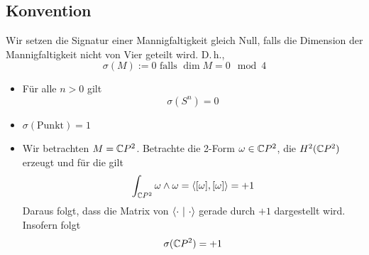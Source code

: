 
\subsection{Konvention}
Wir setzen die Signatur einer Mannigfaltigkeit gleich Null, falls die Dimension der Mannigfaltigkeit nicht von Vier geteilt wird. D.\,h.,
\[ \sigma(M) := 0\text{  falls  } \dim M = 0 \mod{4} \]

\Bsp{}
\begin{itemize}
	\item Für alle $n> 0$ gilt
	\[ \sigma(S^n) = 0 \]
	\item $\sigma(\text{Punkt}) = 1$
	\item Wir betrachten $M = \mathbb{C} P^2$. Betrachte die 2-Form $\omega \in \mathbb{C} P^2$, die $H^2(\mathbb{C} P^2)$ erzeugt und für die gilt
	\[ \int_{\mathbb{C} P^2} \omega \wedge \omega = \left<[\omega], [\omega]\right> = +1 \]
	Daraus folgt, dass die Matrix von $\left<\cdot ~|~\cdot\right>$ gerade durch $+1$ dargestellt wird. Insofern folgt
	\[ \sigma(\mathbb{C} P^2) = +1 \]
\end{itemize}

